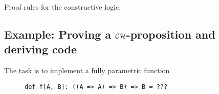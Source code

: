\begin{table}
\begin{centering}
{\small{}}%
\par\end{centering}
\caption{Proof rules for the constructive logic.\label{tab:Proof-rules-for-constructive-logic}}
\end{table}


\subsection{Example: Proving a ${\cal CH}$-proposition and deriving code\label{subsec:Example:-Proving-a-ch-proposition}}

The task is to implement a fully parametric function

\begin{wrapfigure}{l}{0.45\columnwidth}%
\vspace{-0.75\baselineskip}
\begin{lstlisting}
def f[A, B]: ((A => A) => B) => B = ???
\end{lstlisting}

\vspace{-0.9\baselineskip}
\end{wrapfigure}%

